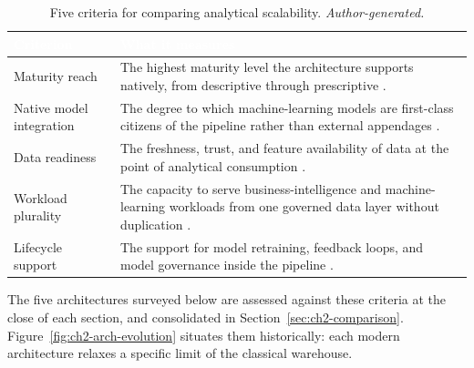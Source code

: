 \begin{table}[H]
\centering
\renewcommand{\arraystretch}{1.35}
\caption{Five criteria for comparing analytical scalability. \textit{Author-generated.}}
\label{tab:ch2-criteria}
\begin{tabularx}{\linewidth}{|>{\raggedright\arraybackslash}p{3.6cm}|>{\raggedright\arraybackslash}X|}
\hline
\rowcolor{tblheader}
\textcolor{white}{\textbf{Criterion}} &
\textcolor{white}{\textbf{What it measures}} \\
\hline
Maturity reach & The highest maturity level the architecture supports natively, from descriptive through prescriptive \parencite{gartner2012ascendancy}. \\
Native model integration & The degree to which machine-learning models are first-class citizens of the pipeline rather than external appendages \parencite{armbrust2021, kreuzberger2023}. \\
Data readiness & The freshness, trust, and feature availability of data at the point of analytical consumption \parencite{harby2024}. \\
Workload plurality & The capacity to serve business-intelligence and machine-learning workloads from one governed data layer without duplication \parencite{armbrust2021}. \\
Lifecycle support & The support for model retraining, feedback loops, and model governance inside the pipeline \parencite{kreuzberger2023, feedback2025}. \\
\hline
\end{tabularx}
\end{table}

The five architectures surveyed below are assessed against these criteria at the close of each section, and consolidated in Section~\ref{sec:ch2-comparison}. Figure~\ref{fig:ch2-arch-evolution} situates them historically: each modern architecture relaxes a specific limit of the classical warehouse.

